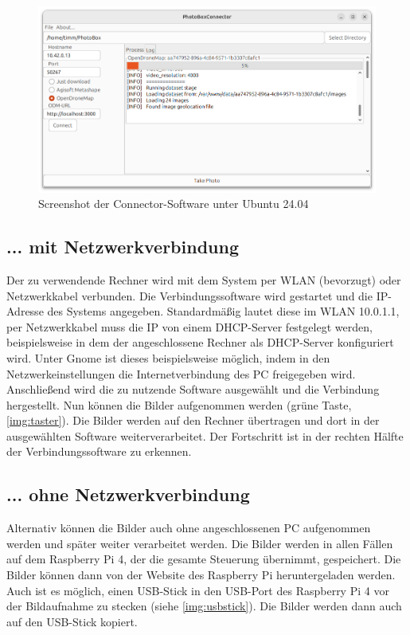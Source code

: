 \documentclass[./00PhotoBox.tex]{subfiles}
\begin{document}
\begin{figure}
    \centering
    \includegraphics[width=1\textwidth]{./img/5_software/connector_screenshot.png}
    \caption{Screenshot der Connector-Software unter Ubuntu 24.04}
    \label{img:connector}
\end{figure}

\subsection{... mit Netzwerkverbindung}
Der zu verwendende Rechner wird mit dem System per WLAN (bevorzugt) oder Netzwerkkabel verbunden. Die Verbindungssoftware wird gestartet und die IP-Adresse des Systems angegeben. Standardmäßig lautet diese im WLAN 10.0.1.1, per Netzwerkkabel muss die IP von einem DHCP-Server festgelegt werden, beispielsweise in dem der angeschlossene Rechner als DHCP-Server konfiguriert wird. Unter Gnome ist dieses beispielsweise möglich, indem in den Netzwerkeinstellungen die Internetverbindung des PC freigegeben wird.
Anschließend wird die zu nutzende Software ausgewählt und die Verbindung hergestellt.
Nun können die Bilder aufgenommen werden (grüne Taste, \autoref{img:taster}). Die Bilder werden auf den Rechner übertragen und dort in der ausgewählten Software weiterverarbeitet. Der Fortschritt ist in der rechten Hälfte der Verbindungssoftware zu erkennen.

\subsection{... ohne Netzwerkverbindung}
Alternativ können die Bilder auch ohne angeschlossenen PC aufgenommen werden und später weiter verarbeitet werden. Die Bilder werden in allen Fällen auf dem Raspberry Pi 4, der die gesamte Steuerung übernimmt, gespeichert. Die Bilder können dann von der Website des Raspberry Pi heruntergeladen werden. Auch ist es möglich, einen USB-Stick in den USB-Port des Raspberry Pi 4 vor der Bildaufnahme zu stecken (siehe \autoref{img:usbstick}). Die Bilder werden dann auch auf den USB-Stick kopiert.
\end{document}
